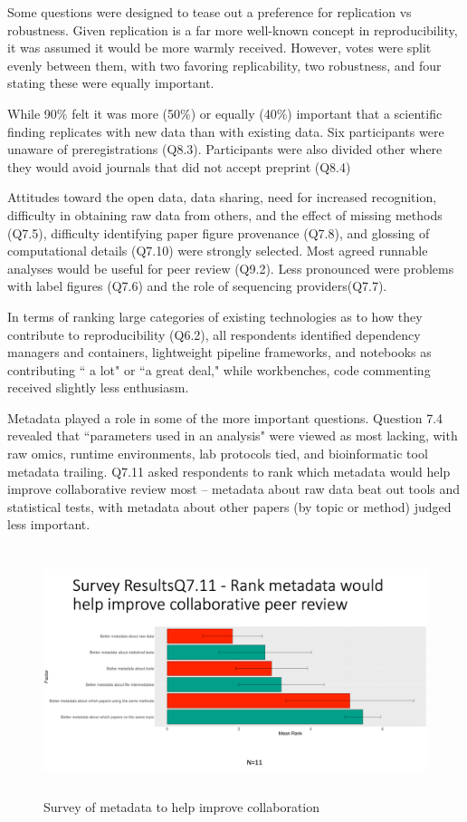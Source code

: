 \documentclass{drexelthesis}
\begin{document}
Some questions were designed to tease out a preference for replication vs robustness. Given replication is a far more well-known concept in reproducibility, it was assumed it would be more warmly received. However, votes were split evenly between them, with two favoring replicability, two robustness, and four stating these were equally important.

While 90$\%$ felt it was more (50$\%$) or equally (40$\%$) important that a scientific finding replicates with new data than with existing data. Six participants were unaware of preregistrations (Q8.3). Participants were also divided other where they would avoid journals that did not accept preprint (Q8.4)

Attitudes toward the open data, data sharing, need for increased recognition, difficulty in obtaining raw data from others, and the effect of missing methods (Q7.5), difficulty identifying paper figure provenance (Q7.8), and glossing of computational details (Q7.10) were strongly selected. Most agreed runnable analyses would be useful for peer review (Q9.2). Less pronounced were problems with label figures (Q7.6) and the role of sequencing providers(Q7.7).

In terms of ranking large categories of existing technologies as to how they contribute to reproducibility (Q6.2), all respondents identified dependency managers and containers, lightweight pipeline frameworks, and notebooks as contributing `` a lot" or ``a great deal," while workbenches, code commenting received slightly less enthusiasm.

Metadata played a role in some of the more important questions. Question 7.4 revealed that ``parameters used in an analysis" were viewed as most lacking, with raw omics, runtime environments, lab protocols tied, and bioinformatic tool metadata trailing. Q7.11 asked respondents to rank which metadata would help improve collaborative review most – metadata about raw data beat out tools and statistical tests, with metadata about other papers (by topic or method) judged less important.


\begin{figure}[h!]
	\centering
	\includegraphics[width=13.76cm,height=7.23cm]{./images/surveymetadata.png}
	\caption{Survey of metadata to help improve collaboration}
	\label{surveymetadata}
\end{figure}
\end{document}
